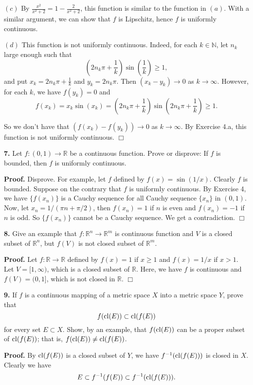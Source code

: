 \documentclass{article}
\begin{document}
$(c)$ By $\frac{x^2}{x^2+2} = 1- \frac{2}{x^2+2}$, this function is
similar to the function in $(a)$. With a similar argument, we can show
that $f$ is Lipschitz, hence $f$ is uniformly continuous.

$(d)$ This function is not uniformly continuous. Indeed, for each
$k\in \mathbb{N}$, let $n_k$ large enough such that \[
\left(2n_k\pi + \frac{1}{k}\right) \sin\left(\frac{1}{k}\right) \ge 1,
\] and put $x_k = 2n_k\pi + \frac{1}{k}$ and $y_k = 2n_k\pi$. Then
$(x_k - y_k) \to 0$ as $k\to \infty$. However, for each $k$, we have
$f(y_k) = 0$ and
\[f(x_k) = x_k\sin(x_k) = \left(2n_k\pi + \frac{1}{k}\right) \sin\left(2n_k\pi + \frac{1}{k}\right) \ge 1.\]

So we don't have that $(f(x_k)- f(y_k)) \to 0$ as $k\to \infty$. By
Exercise 4.a, this function is not uniformly continuous. $\Box$

    \textbf{7.} Let $f:(0,1)\to \mathbb{R}$ be a continuous function. Prove
or disprove: If $f$ is bounded, then $f$ is uniformly continuous.

\textbf{Proof.} Disprove. For example, let $f$ defined by
$f(x) = \sin(1/x)$. Clearly $f$ is bounded. Suppose on the contrary that
$f$ is uniformly continuous. By Exercise 4, we have $\{f(x_n)\}$ is a
Cauchy sequence for all Cauchy sequence $\{x_n\}$ in $(0,1)$. Now, let
$x_n = 1/(\pi n + \pi/2)$, then $f(x_n) = 1$ if $n$ is even and
$f(x_n) = -1$ if $n$ is odd. So $\{f(x_n)\}$ cannot be a Cauchy
sequence. We get a contradiction. $\Box$

    \textbf{8.} Give an example that $f:\mathbb{R}^n \to \mathbb{R}^m$ is
continuous function and $V$ is a closed subset of $\mathbb{R}^n$, but
$f(V)$ is not closed subset of $\mathbb{R}^m$.

\textbf{Proof.} Let $f: \mathbb{R} \to \mathbb{R} $ defined by
$f(x) = 1$ if $x \ge 1$ and $f(x) = 1/x$ if $x > 1$. Let
$V = [1,\infty)$, which is a closed subset of $\mathbb{R}$. Here, we
have $f$ is continuous and $f(V) = (0,1]$, which is not closed in
$\mathbb{R}$. $\Box$

    \textbf{9.} If $f$ is a continuous mapping of a metric space $X$ into a
metric space $Y$, prove that \[ f(\operatorname{cl}(E)) \subset \operatorname{cl}(f(E))\] for every
set $E\subset X$. Show, by an example, that $f(\operatorname{cl}(E))$ can be a proper
subset of $\operatorname{cl}(f(E))$; that is, $f(\operatorname{cl}(E)) \ne \operatorname{cl}(f(E))$.

\textbf{Proof.} By $\operatorname{cl}(f(E))$ is a closed subset of $Y$, we have
$f^{-1}(\operatorname{cl}(f(E)))$ is closed in $X$. Clearly we have
\[E\subset f^{-1}(f(E))\subset f^{-1}(\operatorname{cl}(f(E))).\]
\end{document}
